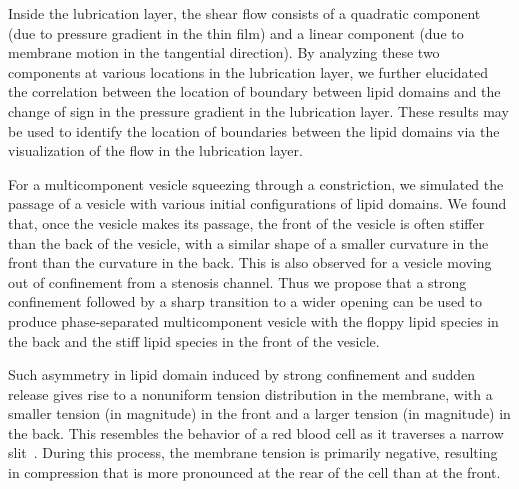 \documentclass[twoside,twocolumn,9pt]{article}
\begin{document}
Inside the lubrication layer, the shear flow consists of a quadratic
component (due to pressure gradient in the thin film) and a linear
component (due to membrane motion in the tangential direction). By
analyzing these two components at various locations in the lubrication
layer, we further elucidated the correlation between the location of
boundary between lipid domains and the change of
sign in the pressure gradient in the lubrication layer. These results
may be used to identify the location of boundaries between the lipid
domains via the visualization of the flow in the lubrication layer.

For a multicomponent vesicle squeezing through a constriction, we
simulated the passage of a vesicle with various initial configurations
of lipid domains. We found that, once the vesicle makes its passage, the
front of the vesicle is often stiffer than the back of the vesicle, with
a similar shape of a smaller curvature in the front than the curvature
in the back. This is also observed for a vesicle moving out of
confinement from a stenosis channel. Thus we propose that a strong
confinement followed by a sharp transition to a wider opening can be
used to produce phase-separated multicomponent vesicle with the floppy
lipid species in the back and the stiff lipid species in the front of
the vesicle.

Such asymmetry in lipid domain induced by strong confinement and sudden
release gives rise to a nonuniform tension distribution in the membrane,
with a smaller tension (in magnitude) in the front and a larger tension
(in magnitude) in the back. This resembles the behavior of a red blood cell as it traverses a narrow slit~\cite{LuPeng2019_PoF}. During this process, the membrane tension is primarily negative, resulting in compression that is more pronounced at the rear of the cell than at the front.
\end{document}
